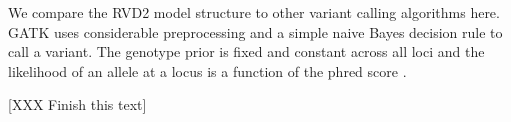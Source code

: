 \documentclass[11pt,reqno]{amsart}
\begin{document}
We compare the RVD2 model structure to other variant calling algorithms here. GATK uses considerable preprocessing and a simple naive Bayes decision rule to call a variant. The genotype prior is fixed and constant across all loci and the likelihood of an allele at a locus is a function of the phred score \cite{McKenna2010}.

[XXX Finish this text]





%
%
%
%
%
%
%
%
\end{document}

